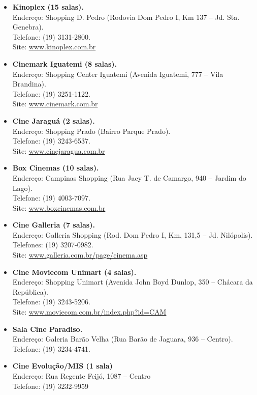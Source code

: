 \begin{itemize}
\item   \textbf{Kinoplex (15 salas).}
		\\Endereço: Shopping D. Pedro (Rodovia Dom Pedro I, Km 137 -- Jd. Sta. Genebra).
		\\Telefone: (19) 3131-2800.
		\\Site: \url{www.kinoplex.com.br}

\item   \textbf{Cinemark Iguatemi (8 salas).}
		\\Endereço: Shopping Center Iguatemi (Avenida Iguatemi, 777 -- Vila Brandina).
		\\Telefone: (19) 3251-1122.
		\\Site: \url{www.cinemark.com.br}

\item   \textbf{Cine Jaraguá (2 salas).}
		\\Endereço: Shopping Prado (Bairro Parque Prado).
		\\Telefone: (19) 3243-6537.
		\\Site: \url{www.cinejaragua.com.br}

\item   \textbf{Box Cinemas (10 salas).}
		\\Endereço: Campinas Shopping (Rua Jacy T. de Camargo, 940 -- Jardim do Lago).
		\\Telefone: (19) 4003-7097.
		\\Site: \url{www.boxcinemas.com.br}

\item   \textbf{Cine Galleria (7 salas).}
		\\Endereço: Galleria Shopping (Rod. Dom Pedro I, Km, 131,5 -- Jd. Nilópolis).
		\\Telefones: (19) 3207-0982.
		\\Site: \url{www.galleria.com.br/page/cinema.asp}

\item   \textbf{Cine Moviecom Unimart (4 salas).}
		\\Endereço: Shopping Unimart (Avenida John Boyd Dunlop, 350 -- Chácara da República).
		\\Telefone: (19) 3243-5206.
		\\Site: \url{www.moviecom.com.br/index.php?id=CAM}

\item   \textbf{Sala Cine Paradiso.}
		\\Endereço: Galeria Barão Velha (Rua Barão de Jaguara, 936 -- Centro).
		\\Telefone: (19) 3234-4741.

\item   \textbf{Cine Evolução/MIS (1 sala)}
		\\Endereço: Rua Regente Feijó, 1087 -- Centro
		\\Telefone: (19) 3232-9959
\end{itemize}

